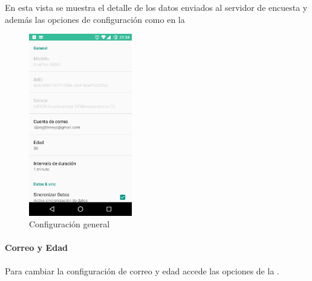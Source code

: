 {En esta vista se  muestra el detalle de los datos enviados al servidor de encuesta y además las opciones
de configuración como en la 
\begin{figure}[!h]
    \centering
    \includegraphics[width=0.4\textwidth]{anexos/graphics/conf_gral.jpg}
\caption{Configuración general}\label{config_adic:id2}
\end{figure}


\paragraph{Correo y Edad}
\label{config_adic:correo-y-edad}
Para cambiar la configuración de correo y edad accede las opciones de la .

}
